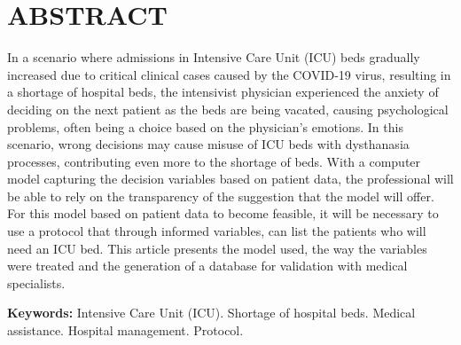 \documentclass[12pt]{article}
\begin{document}
\section{ABSTRACT} 
In a scenario where admissions in Intensive Care Unit (ICU) beds gradually increased due to critical clinical cases caused by the COVID-19 virus, resulting in a shortage of hospital beds, the intensivist physician experienced the anxiety of deciding on the next patient as the beds are being vacated, causing psychological problems, often being a choice based on the physician's emotions. In this scenario, wrong decisions may cause misuse of ICU beds with dysthanasia processes, contributing even more to the shortage of beds. With a computer model capturing the decision variables based on patient data, the professional will be able to rely on the transparency of the suggestion that the model will offer. For this model based on patient data to become feasible, it will be necessary to use a protocol that through informed variables, can list the patients who will need an ICU bed. This article presents the model used, the way the variables were treated and the generation of a database for validation with medical specialists.

\textbf{Keywords:} Intensive Care Unit (ICU). Shortage of hospital beds. Medical assistance. Hospital management. Protocol.
\end{document}
